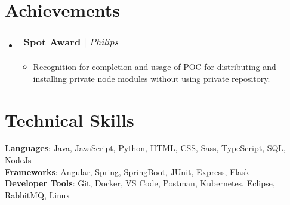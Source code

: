 \documentclass[letterpaper,11pt]{article}
\makeatletter
\newcommand{\resumeItem}[1]{
  \item\small{
    {#1 \vspace{-2pt}}
  }
}
\newcommand{\resumeProjectHeading}[2]{
    \item
    \begin{tabular*}{0.97\textwidth}{l@{\extracolsep{\fill}}r}
      \small#1 & #2 \\
    \end{tabular*}\vspace{-7pt}
}
\newcommand{\resumeSubHeadingListStart}{\begin{itemize}[leftmargin=0.15in, label={}]}
\newcommand{\resumeSubHeadingListEnd}{\end{itemize}}
\newcommand{\resumeItemListStart}{\begin{itemize}}
\newcommand{\resumeItemListEnd}{\end{itemize}\vspace{-5pt}}
\makeatother
\begin{document}
\section{Achievements}
    \resumeSubHeadingListStart
      \resumeProjectHeading
          {\textbf{Spot Award} $|$ \emph{Philips}}{}
          \resumeItemListStart
            \resumeItem{Recognition for completion and usage of POC for distributing and installing private node modules without using private repository.}
          \resumeItemListEnd
    \resumeSubHeadingListEnd
%
\section{Technical Skills}
 \begin{itemize}[leftmargin=0.15in, label={}]
    \small{\item{
     \textbf{Languages}{: Java, JavaScript, Python, HTML, CSS, Sass, TypeScript, SQL, NodeJs} \\
     \textbf{Frameworks}{: Angular, Spring, SpringBoot, JUnit, Express, Flask} \\
     \textbf{Developer Tools}{: Git, Docker, VS Code, Postman, Kubernetes, Eclipse, RabbitMQ, Linux} \\
    }}
 \end{itemize}


\end{document}
